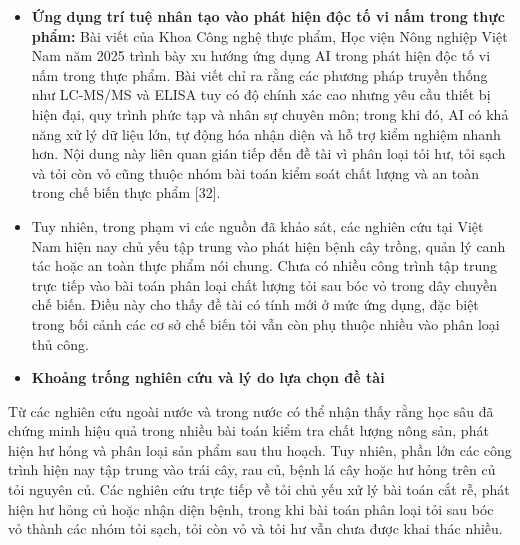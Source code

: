 \documentclass[
]{article}
\begin{document}
\begin{itemize}
  trong nhận dạng ảnh ong mật mang phấn. Nhóm nghiên cứu khảo sát các
  kiến trúc CNN, học chuyển giao như VGG16, VGG19, ResNet50, ResNet101
  và xây dựng mô hình CNN cơ bản nhằm giảm chi phí tính toán. Nghiên cứu
  cũng sử dụng các kỹ thuật tăng cường dữ liệu như xoay ảnh, dịch
  chuyển, cắt, phóng to/thu nhỏ và lật ảnh để cải thiện khả năng tổng
  quát hóa. Công trình này liên quan đến đề tài vì cùng sử dụng CNN cho
  bài toán nhận dạng ảnh trong nông nghiệp, đồng thời cho thấy hướng
  thiết kế mô hình nhẹ, hiệu quả là cần thiết khi muốn triển khai thực
  tế {[}31{]}.
\item
  \textbf{Ứng dụng trí tuệ nhân tạo vào phát hiện độc tố vi nấm trong
  thực phẩm:} Bài viết của Khoa Công nghệ thực phẩm, Học viện Nông
  nghiệp Việt Nam năm 2025 trình bày xu hướng ứng dụng AI trong phát
  hiện độc tố vi nấm trong thực phẩm. Bài viết chỉ ra rằng các phương
  pháp truyền thống như LC-MS/MS và ELISA tuy có độ chính xác cao nhưng
  yêu cầu thiết bị hiện đại, quy trình phức tạp và nhân sự chuyên môn;
  trong khi đó, AI có khả năng xử lý dữ liệu lớn, tự động hóa nhận diện
  và hỗ trợ kiểm nghiệm nhanh hơn. Nội dung này liên quan gián tiếp đến
  đề tài vì phân loại tỏi hư, tỏi sạch và tỏi còn vỏ cũng thuộc nhóm bài
  toán kiểm soát chất lượng và an toàn trong chế biến thực phẩm {[}32{]}.
\end{itemize}

\begin{itemize}
\item
  Tuy nhiên, trong phạm vi các nguồn đã khảo sát, các nghiên cứu tại
  Việt Nam hiện nay chủ yếu tập trung vào phát hiện bệnh cây trồng, quản
  lý canh tác hoặc an toàn thực phẩm nói chung. Chưa có nhiều công trình
  tập trung trực tiếp vào bài toán phân loại chất lượng tỏi sau bóc vỏ
  trong dây chuyền chế biến. Điều này cho thấy đề tài có tính mới ở mức
  ứng dụng, đặc biệt trong bối cảnh các cơ sở chế biến tỏi vẫn còn phụ
  thuộc nhiều vào phân loại thủ công.
\end{itemize}

\begin{itemize}
\item
  \textbf{Khoảng trống nghiên cứu và lý do lựa chọn đề tài}
\end{itemize}

Từ các nghiên cứu ngoài nước và trong nước có thể nhận thấy rằng học sâu
đã chứng minh hiệu quả trong nhiều bài toán kiểm tra chất lượng nông
sản, phát hiện hư hỏng và phân loại sản phẩm sau thu hoạch. Tuy nhiên,
phần lớn các công trình hiện nay tập trung vào trái cây, rau củ, bệnh lá
cây hoặc hư hỏng trên củ tỏi nguyên củ. Các nghiên cứu trực tiếp về tỏi
chủ yếu xử lý bài toán cắt rễ, phát hiện hư hỏng củ hoặc nhận diện bệnh,
trong khi bài toán phân loại tỏi sau bóc vỏ thành các nhóm tỏi sạch, tỏi
còn vỏ và tỏi hư vẫn chưa được khai thác nhiều.
\end{document}
